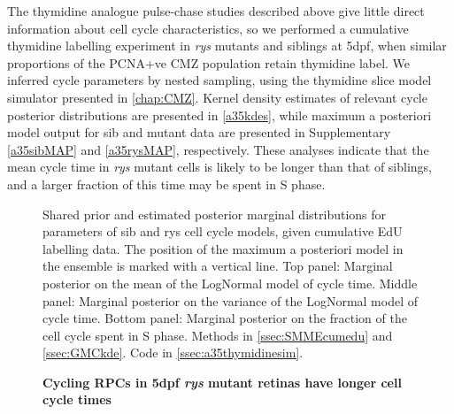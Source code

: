 \documentclass{ut-thesis}
\begin{document}
\begin{NoHyper}
The thymidine analogue pulse-chase studies described above give little direct information about cell cycle characteristics, so we performed a cumulative thymidine labelling experiment in \textit{rys} mutants and siblings at 5dpf, when similar proportions of the PCNA+ve CMZ population retain thymidine label. We inferred cycle parameters by nested sampling, using the thymidine slice model simulator presented in \autoref{chap:CMZ}. Kernel density estimates of relevant cycle posterior distributions are presented in \autoref{a35kdes}, while maximum a posteriori model output for sib and mutant data are presented in Supplementary \autoref{a35sibMAP} and \autoref{a35rysMAP}, respectively. These analyses indicate that the mean cycle time in \textit{rys} mutant cells is likely to be longer than that of siblings, and a larger fraction of this time may be spent in S phase.

\begin{figure}[!h]
    \caption{{\bf Cycling RPCs in 5dpf \textit{rys} mutant retinas have longer cell cycle times}}
    Shared prior and estimated posterior marginal distributions for parameters of sib and rys cell cycle models, given cumulative EdU labelling data. The position of the maximum a posteriori model in the ensemble is marked with a vertical line. Top panel: Marginal posterior on the mean of the LogNormal model of cycle time. Middle panel: Marginal posterior on the variance of the LogNormal model of cycle time. Bottom panel: Marginal posterior on the fraction of the cell cycle spent in S phase.
    Methods in \autoref{ssec:SMMEcumedu} and \autoref{ssec:GMCkde}. Code in \autoref{ssec:a35thymidinesim}.
    \label{a35kdes}
\end{figure}


\end{NoHyper}
\end{document}

